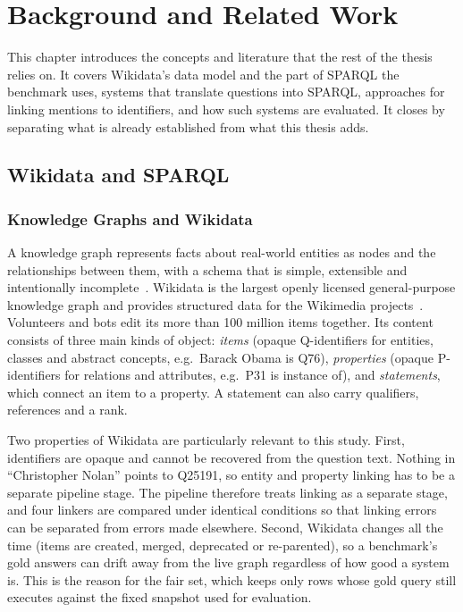 \chapter{Background and Related Work}

\label{ch:background}

This chapter introduces the concepts and literature that the rest of the thesis relies on.
It covers Wikidata's data model and the part of SPARQL the benchmark uses, systems that translate questions into SPARQL, approaches for linking mentions to identifiers, and how such systems are evaluated.
It closes by separating what is already established from what this thesis adds.

\section{Wikidata and SPARQL}

\subsection{Knowledge Graphs and
Wikidata}

\label{sec:kgs}

A knowledge graph represents facts about real-world entities as nodes and the relationships between them, with a schema that is simple, extensible and intentionally incomplete~\citep{hogan2021kg}.
Wikidata is the largest openly licensed general-purpose knowledge graph and provides structured data for the Wikimedia projects~\citep{vrandecic2014wikidata}.
Volunteers and bots edit its more than 100 million items together.
Its content consists of three main kinds of object: \emph{items} (opaque Q-identifiers for entities, classes and abstract concepts, e.g.\ Barack Obama is Q76), \emph{properties} (opaque P-identifiers for relations and attributes, e.g.\ P31 is instance of), and \emph{statements}, which connect an item to a property.
A statement can also carry qualifiers, references and a rank.

Two properties of Wikidata are particularly relevant to this study.
First, identifiers are opaque and cannot be recovered from the question text.
Nothing in ``Christopher Nolan'' points to Q25191, so entity and property linking has to be a separate pipeline stage.
The pipeline therefore treats linking as a separate stage, and four linkers are compared under identical conditions so that linking errors can be separated from errors made elsewhere.
Second, Wikidata changes all the time (items are created, merged, deprecated or re-parented), so a benchmark's gold answers can drift away from the live graph regardless of how good a system is.
This is the reason for the fair set, which keeps only rows whose gold query still executes against the fixed snapshot used for evaluation.

